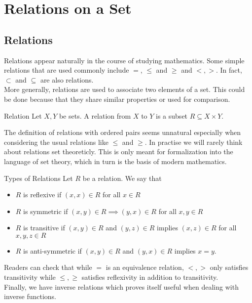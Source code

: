 \documentclass[a4paper]{article}
\begin{document}
\pagebreak
\section{Relations on a Set}
\subsection{Relations}
Relations appear naturally in the course of studying mathematics. Some simple relations that are used commonly include $=$, $\leq$ and $\geq$ and $<,>$. In fact, $\subset$ and $\subseteq$ are also relations. \\
More generally, relations are used to associate two elements of a set. This could be done because that they share similar properties or used for comparison. 

\begin{defn}{Relation}{} Let $X,Y$ be sets. A relation from $X$ to $Y$ is a subset $R\subseteq X\times Y$. 
\end{defn}

The definition of relations with ordered pairs seems unnatural especially when considering the usual relations like $\leq$ and $\geq$. In practise we will rarely think about relations set theoreticly. This is only meant for formalization into the language of set theory, which in turn is the basis of modern mathematics. 

\begin{defn}{Types of Relations}{} Let $R$ be a relation. We say that 
\begin{itemize}
\item $R$ is reflexive if $(x,x)\in R$ for all $x\in R$
\item $R$ is symmetric if $(x,y)\in R\implies (y,x)\in R$ for all $x,y\in R$
\item $R$ is transitive if $(x,y)\in R$ and $(y,z)\in R$ implies $(x,z)\in R$ for all $x,y,z\in R$
\item $R$ is anti-symmetric if $(x,y)\in R$ and $(y,x)\in R$ implies $x=y$. 
\end{itemize}
\end{defn}

Readers can check that while $=$ is an equivalence relation, $<,>$ only satisfies transitivity while $\leq,\geq$ satisfies reflexivity in addition to transitivity. \\

Finally, we have inverse relations which proves itself useful when dealing with inverse functions. 
\end{document}
